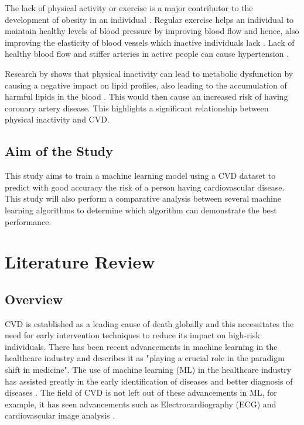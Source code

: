 \documentclass[12pt, a4paper,twoside]{report}
\numberwithin{equation}{chapter}
\begin{document}
The lack of physical activity or exercise is a major contributor to the development of obesity in an individual \parencite{Kazmi_Nagi2022}. Regular exercise helps an individual to maintain healthy levels of blood pressure by improving blood flow and hence, also improving the elasticity of blood vessels which inactive individuals lack \parencite{Hegde_Solomon_2015}. Lack of healthy blood flow and stiffer arteries in active people can cause hypertension \parencite{Gamage2021}. 

Research by \parencite{Scher2019} shows that physical inactivity can lead to metabolic dysfunction by causing a negative impact on lipid profiles, also leading to the accumulation of harmful lipids in the blood \parencite{DaSilva2022}. This would then cause an increased risk of having coronary artery disease. This highlights a significant relationship between physical inactivity and CVD.

\section{Aim of the Study}
This study aims to train a machine learning model using a CVD dataset to predict with good accuracy the risk of a person having cardiovascular disease. This study will also perform a comparative analysis between several machine learning algorithms to determine which algorithm can demonstrate the best performance.



\chapter{Literature Review}\label{ch:2}

\section{Overview}
CVD is established as a leading cause of death globally and this necessitates the need for early intervention techniques to reduce its impact on high-risk individuals. There has been recent advancements in machine learning in the healthcare industry and \parencite{CHAKRABORTY2024100164} describes it as "playing a crucial role in the paradigm shift in medicine". The use of machine learning (ML) in the healthcare industry has assisted greatly in the early identification of diseases and better diagnosis of diseases \parencite{olaoyelucas2024}. The field of CVD is not left out of these advancements in ML, for example, it has seen advancements such as Electrocardiography (ECG) and cardiovascular image analysis \parencite{9791776}.
\end{document}
